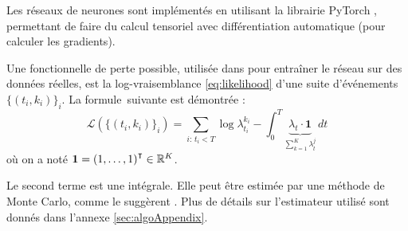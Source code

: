 \documentclass[../main.tex]{subfiles}
\begin{document}
	
Les réseaux de neurones sont implémentés en utilisant la librairie \textsf{PyTorch} \cite{paszke2017automatic}, permettant de faire du calcul tensoriel avec différentiation automatique (pour calculer les gradients).

Une fonctionnelle de perte possible, utilisée dans \autocite{meiEisnerNeuralHawkes} pour entraîner le réseau sur des données réelles, est la log-vraisemblance \eqref{eq:likelihood} d'une suite d'événements $\{(t_i,k_i)\}_i$. La formule\footnotemark~suivante est démontrée \cite[15]{meiEisnerNeuralHawkes}: 
\begin{equation}\label{eq:explicitLikelihood}
\mathcal{L}\left(\{(t_i,k_i)\}_i\right)
=
\sum_{i:\,t_i < T} \log\lambda^{k_i}_{t_i} - \int_0^T \underbrace{\lambda_t\cdot\mathbf{1}}_{\sum_{k=1}^K\lambda^j_t}\,dt
\end{equation}
où on a noté $\mathbf{1} = {(1,\ldots,1)}^\intercal\in\mathbb{R}^K$.


Le second terme est une intégrale. Elle peut être estimée par une méthode de Monte Carlo, comme le suggèrent \citeauthor{meiEisnerNeuralHawkes}. Plus de détails sur l'estimateur utilisé sont donnés dans l'annexe \autoref{sec:algoAppendix}.
\end{document}
